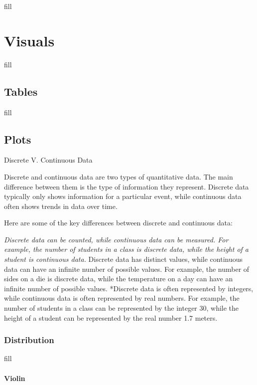 \documentclass[
  b5paper]{book}
\begin{document}
fill

\hypertarget{visuals-1}{%
\chapter{Visuals}\label{visuals-1}}

fill

\hypertarget{tables}{%
\section{Tables}\label{tables}}

fill

\hypertarget{plots}{%
\section{Plots}\label{plots}}

Discrete V. Continuous Data

Discrete and continuous data are two types of quantitative data. The main difference between them is the type of information they represent. Discrete data typically only shows information for a particular event, while continuous data often shows trends in data over time.

Here are some of the key differences between discrete and continuous data:

\emph{Discrete data can be counted, while continuous data can be measured. For example, the number of students in a class is discrete data, while the height of a student is continuous data.} Discrete data has distinct values, while continuous data can have an infinite number of possible values. For example, the number of sides on a die is discrete data, while the temperature on a day can have an infinite number of possible values. *Discrete data is often represented by integers, while continuous data is often represented by real numbers. For example, the number of students in a class can be represented by the integer 30, while the height of a student can be represented by the real number 1.7 meters.

\hypertarget{distribution}{%
\subsection*{Distribution}\label{distribution}}

fill

\hypertarget{violin}{%
\subsubsection*{Violin}\label{violin}}
\end{document}
